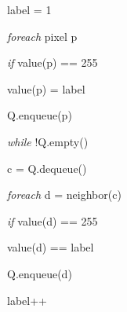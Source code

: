 \begin{easylist}
  \medskip
  \ind label = 1
  
  \ind \textit{foreach} pixel p
  
  \ind \ind \textit{if} value(p) == 255
  
  \ind \ind \ind value(p) = label

  \ind \ind \ind Q.enqueue(p)

  \ind \ind \ind \textit{while} !Q.empty()

  \ind \ind \ind \ind c = Q.dequeue()

  \ind \ind \ind \ind \textit{foreach} d = neighbor(c)

  \ind \ind \ind \ind \ind \textit{if} value(d) == 255

  \ind \ind \ind \ind \ind \ind value(d) == label
  
  \ind \ind \ind \ind \ind \ind Q.enqueue(d)

  \ind \ind \ind label++
  
  \medskip
  
\end{easylist}
